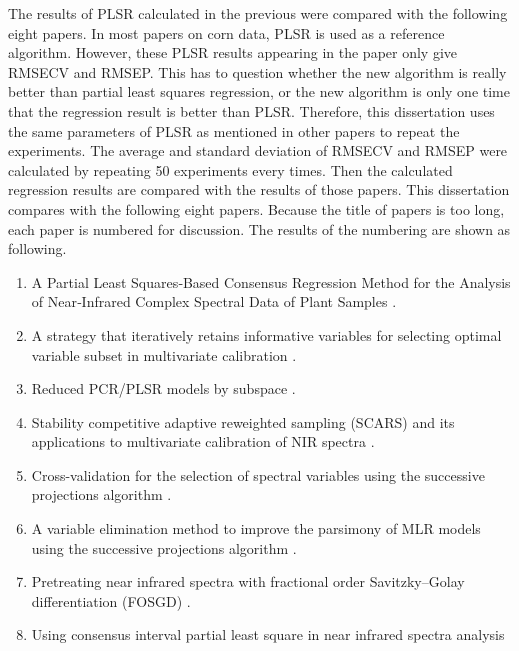 \documentclass[a4paper,12pt,titlepage]{article} %
\numberwithin{equation}{section}  %
\begin{document}
	The results of PLSR calculated in the previous were compared with the following eight papers. In most papers on corn data, PLSR is used as a reference algorithm. However, these PLSR results appearing in the paper only give RMSECV and RMSEP.  This has to question whether the new algorithm is really better than partial least squares regression, or the new algorithm is only one time that the regression result is better than PLSR.  Therefore, this dissertation uses the same parameters of PLSR as mentioned in other papers to repeat the experiments. The average and standard deviation of RMSECV and RMSEP were calculated by repeating 50 experiments every times. Then the calculated regression results are compared with the results of those papers.
	This dissertation compares with the following eight papers. Because the title of papers is too long, each paper is numbered for discussion. The results of the numbering are shown as following.
	
	\begin{enumerate}
		\item A Partial Least Squares‐Based Consensus Regression Method for the Analysis of Near‐Infrared Complex Spectral Data of Plant Samples \citep{1su2006partial}.
		
		\item A strategy that iteratively retains informative variables for selecting optimal variable subset in multivariate calibration \citep{2yun2014strategy}.
		
		\item Reduced PCR/PLSR models by subspace \citep{4ergon2006reduced}.
		
		\item Stability competitive adaptive reweighted sampling (SCARS) and its applications to multivariate calibration of NIR spectra \citep{5zheng2012stability}.
		
		\item Cross-validation for the selection of spectral variables using the successive projections algorithm \citep{3galvao2007cross}.   
		
		\item A variable elimination method to improve the parsimony of MLR models using the successive projections algorithm \citep{7galvao2008variable}.            
		
		\item Pretreating near infrared spectra with fractional order Savitzky–Golay differentiation (FOSGD) \citep{6zheng2015pretreating}.
		
		\item Using consensus interval partial least square in near infrared spectra analysis \citep{8ji2015using}
			
	\end{enumerate}
	
\end{document}
